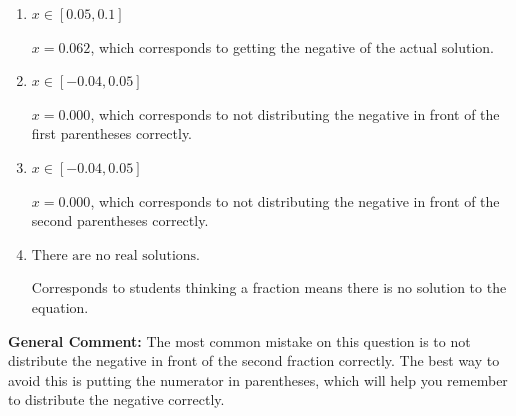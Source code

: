 \documentclass{extbook}[14pt]
\begin{document}
\begin{enumerate}
{\begin{enumerate}[label=\Alph*.]
* $x = 0.000$, which is the correct option.
\item \( x \in [0.05, 0.1] \)

$x = 0.062$, which corresponds to getting the negative of the actual solution.
\item \( x \in [-0.04, 0.05] \)

$x = 0.000$, which corresponds to not distributing the negative in front of the first parentheses correctly.
\item \( x \in [-0.04, 0.05] \)

$x = 0.000$, which corresponds to not distributing the negative in front of the second parentheses correctly.
\item \( \text{There are no real solutions.} \)

Corresponds to students thinking a fraction means there is no solution to the equation.
\end{enumerate}

\textbf{General Comment:} The most common mistake on this question is to not distribute the negative in front of the second fraction correctly. The best way to avoid this is putting the numerator in parentheses, which will help you remember to distribute the negative correctly.
}
\end{enumerate}
\end{document}
